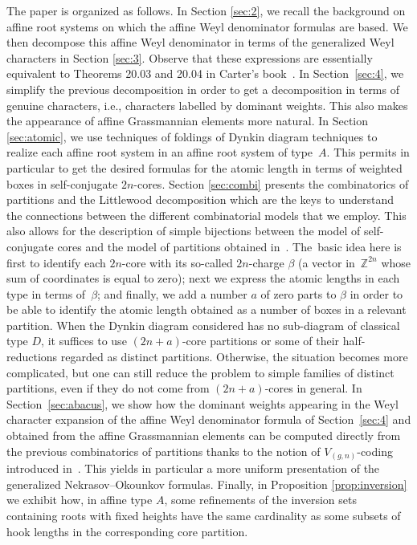 \documentclass[10pt,a4paper]{amsart}
\numberwithin{equation}{section}
\begin{document}
The paper is organized as follows. In Section \ref{sec:2}, we recall the background on affine root systems on which the affine Weyl denominator formulas are based. We then decompose this affine Weyl denominator in terms of the generalized Weyl characters in Section \ref{sec:3}. Observe that these expressions are essentially equivalent to Theorems 20.03 and 20.04 in Carter's book~\cite{carter_affine}. In Section~\ref{sec:4}, we simplify the previous decomposition in order to get a decomposition in terms of genuine characters, i.e., characters labelled by dominant weights. This also makes the appearance of affine Grassmannian elements more natural. In Section \ref{sec:atomic}, we use techniques of foldings of Dynkin diagram techniques to
realize each affine root system in an affine root system of type~$A$. This
permits in particular to get the desired formulas for the atomic length in
terms of weighted boxes in self-conjugate $2n$-cores. Section \ref{sec:combi} presents the combinatorics of partitions and the Littlewood decomposition which are the keys to understand the connections between the different combinatorial models that we employ. This also allows for the description of simple bijections between the model of self-conjugate cores and the model
of partitions obtained in~\cite{Wmac}. The~basic idea here is first to
identify each $2n$-core with its so-called $2n$-charge $\beta $ \big(a vector in~$\mathbb{Z}^{2n}$ whose sum of coordinates is equal to zero\big); next we
express the atomic lengths in each type in terms of~$\beta $; and finally, we
add a number $a$ of zero parts to $\beta $ in order to be able to identify the atomic length obtained as a number of boxes in a relevant partition.
When the Dynkin diagram considered has no sub-diagram of classical type $D$,
it suffices to use $(2n+a)$-core partitions or some of their
half-reductions regarded as distinct partitions. Otherwise, the situation becomes more complicated, but one
can still reduce the problem to simple families of distinct partitions, even if
they do not come from $(2n+a)$-cores in general. In Section~\ref{sec:abacus}, we
show how the dominant weights appearing in the Weyl character expansion of
the affine Weyl denominator formula of Section~\ref{sec:4} and obtained from the affine Grassmannian elements can be computed directly
from the previous combinatorics of partitions thanks to the notion of
$V_{(g,n)}$-coding introduced in~\cite{Wmac}. This yields in particular a more uniform presentation of the generalized Nekrasov--Okounkov formulas.
 Finally, in Proposition \ref{prop:inversion} we exhibit how, in affine type $A$, some refinements of the inversion sets containing roots with fixed heights have the same cardinality as some subsets of hook lengths in the corresponding core partition.
\end{document}
